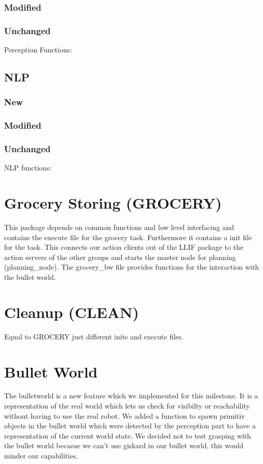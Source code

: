 \documentclass[main.tex]{subfiles}
\begin{document}
                \subsubsection{Modified}
                \subsubsection{Unchanged}Perception Functions:
                
                \subsection{NLP}
                \subsubsection{New}
                \subsubsection{Modified}
                \subsubsection{Unchanged}NLP functions:
                
                \section{Grocery Storing (GROCERY)}
                This package depends on common functions and low level interfacing and contains the execute file for the grocery task. Furthermore it contains a init file for the task. This connects our action clients out of the LLIF package to the action servers of the other groups and starts the master node for planning (planning\_node). The grocery\_bw file provides functions for the interaction with the bullet world.   
                \section{Cleanup (CLEAN)}
                Equal to GROCERY just different inits and execute files.
                \section{Bullet World}
                The bulletworld is a new feature which we implemented for this milestone. It is a representation of the real world which lets us check for visibilty or reachability without having to use the real robot. We added a function to spawn primitiv objects in the bullet world which were detected by the perception part to have a representation of the current world state. We decided not to test grasping with the bullet world becasue we can't use giskard in our bullet world, this would minder our capabilities.
                
\end{document}
